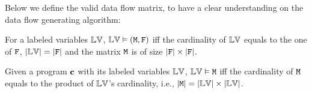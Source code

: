 {
}
%
Below we define the valid data flow matrix, to have a clear understanding on the data flow generating algorithm:
\begin{defn}
For a labeled variables $\mathbb{LV}$, $\mathbb{LV} \vDash (\mathtt{M},\mathtt{F})$ iff the cardinality of $\mathbb{LV}$ equals to the one of $\mathtt{F}$, $|\mathbb{LV}| = |\mathtt{F}|$ 
and the matrix $\mathtt{M}$ is of size $|\mathtt{F}| \times |\mathtt{F}|$.
\end{defn}
{
\begin{defn}
Given a program ${\boldsymbol{\mathbf{c}}}$ with its labeled variables $\mathbb{LV}$, 
$\mathbb{LV} \vDash \mathtt{M}$ iff the cardinality of $\mathtt{M}$ equals to the product of  $\mathbb{LV}$'s cardinality,
i.e., $|\mathtt{M}| = |\mathbb{LV}| \times |\mathbb{LV}|$.
\end{defn}
}%
%
%

